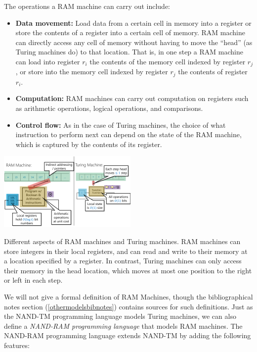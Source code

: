 The operations a RAM machine can carry out include:

\begin{itemize}
\item
  \textbf{Data movement:} Load data from a certain cell in memory into a
  register or store the contents of a register into a certain cell of
  memory. RAM machine can directly access any cell of memory without
  having to move the ``head'' (as Turing machines do) to that location.
  That is, in one step a RAM machine can load into register \(r_i\) the
  contents of the memory cell indexed by register \(r_j\), or store into
  the memory cell indexed by register \(r_j\) the contents of register
  \(r_i\).
\item
  \textbf{Computation:} RAM machines can carry out computation on
  registers such as arithmetic operations, logical operations, and
  comparisons.
\item
  \textbf{Control flow:} As in the case of Turing machines, the choice
  of what instruction to perform next can depend on the state of the RAM
  machine, which is captured by the contents of its register.
\end{itemize}


\begin{marginfigure}
\centering
\includegraphics[width=\linewidth, height=1.5in, keepaspectratio]{../figure/ramvsturing.png}
\caption{Different aspects of RAM machines and Turing machines. RAM
machines can store integers in their local registers, and can read and
write to their memory at a location specified by a register. In
contrast, Turing machines can only access their memory in the head
location, which moves at most one position to the right or left in each
step.}
\label{ramvsturingfig}
\end{marginfigure}

We will not give a formal definition of RAM Machines, though the
bibliographical notes section (\cref{othermodelsbibnotes}) contains
sources for such definitions. Just as the NAND-TM programming language
models Turing machines, we can also define a \emph{NAND-RAM programming
language} that models RAM machines. The NAND-RAM programming language
extends NAND-TM by adding the following features:

